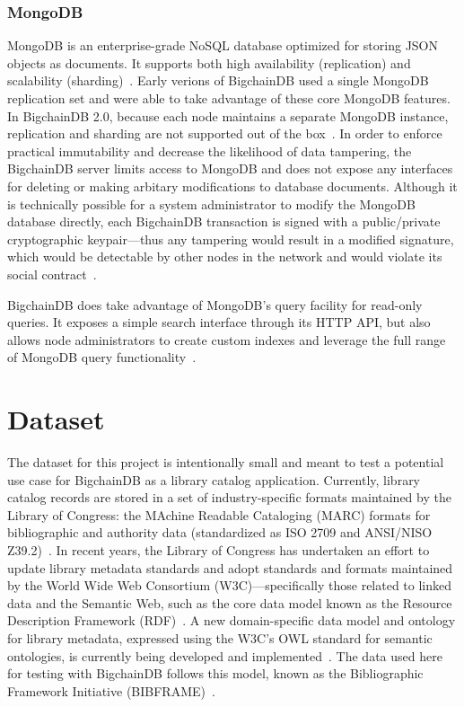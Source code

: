 \subsubsection{MongoDB}
MongoDB is an enterprise-grade NoSQL database optimized for storing
JSON objects as documents. It supports both high availability (replication)
and scalability (sharding)~\cite{mongo18}. Early verions of BigchainDB used
a single MongoDB replication set and were able to take advantage of these
core MongoDB features. In BigchainDB 2.0, because each node maintains a
separate MongoDB instance, replication and sharding are not supported out of
the box~\cite{troyM18b}. In order to enforce practical immutability and
decrease the likelihood of data tampering, the BigchainDB server limits
access to MongoDB and does not expose any interfaces for deleting or making
arbitary modifications to database documents. Although it is technically
possible for a system administrator to modify the MongoDB database
directly, each BigchainDB transaction is signed with a public/private
cryptographic keypair---thus any tampering would result in a modified
signature, which would be detectable by other nodes in the network and would
violate its social contract~\cite{bigDB18}.

BigchainDB does take advantage of MongoDB's query facility for
read-only queries. It exposes a simple search interface through its HTTP
API, but also allows node administrators to create custom indexes and
leverage the full range of MongoDB query functionality~\cite{bdb18d}.

\section{Dataset}
The dataset for this project is intentionally small and meant to test a
potential use case for BigchainDB as a library catalog application.
Currently, library catalog records are stored in a set of industry-specific
formats maintained by the Library of Congress: the MAchine Readable
Cataloging (MARC) formats for bibliographic and authority data (standardized
as ISO 2709 and ANSI/NISO Z39.2)~\cite{kF12, lcnetdev}. In recent years, the
Library of Congress has undertaken an effort to update library metadata
standards and adopt standards and formats maintained by the World Wide Web
Consortium (W3C)---specifically those related to linked data and the
Semantic Web, such as the core data model known as the Resource Description
Framework (RDF)~\cite{lcbf, rdf11}. A new domain-specific data model and
ontology for library metadata, expressed using the W3C's OWL standard for
semantic ontologies, is currently being developed and
implemented~\cite{owl2}. The data used here for testing with BigchainDB
follows this model, known as the Bibliographic Framework Initiative
(BIBFRAME)~\cite{lcbf}.

